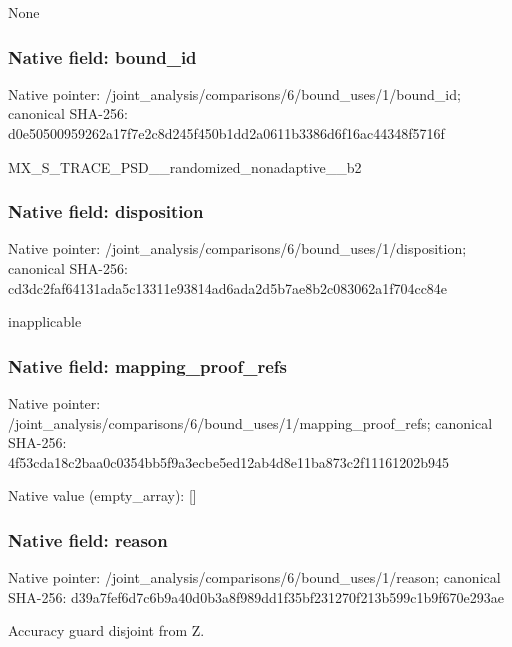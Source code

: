 \documentclass[10pt,a4paper]{article}
\begin{document}
\begingroup\raggedright\sloppy None\par\endgroup

\subsubsection{Native field: bound\_\allowbreak{}id}
Native pointer: /joint\_\allowbreak{}analysis/comparisons/6/bound\_\allowbreak{}uses/1/bound\_\allowbreak{}id; canonical SHA-256: d0e50500959262a17f7e2c8d245f450b1dd2a0611b3386d6f16ac44348f5716f

\begingroup\raggedright\sloppy MX\_\allowbreak{}S\_\allowbreak{}TRACE\_\allowbreak{}PSD\_\allowbreak{}\_\allowbreak{}randomized\_\allowbreak{}nonadaptive\_\allowbreak{}\_\allowbreak{}b2\par\endgroup

\subsubsection{Native field: disposition}
Native pointer: /joint\_\allowbreak{}analysis/comparisons/6/bound\_\allowbreak{}uses/1/disposition; canonical SHA-256: cd3dc2faf64131ada5c13311e93814ad6ada2d5b7ae8b2c083062a1f704cc84e

\begingroup\raggedright\sloppy inapplicable\par\endgroup

\subsubsection{Native field: mapping\_\allowbreak{}proof\_\allowbreak{}refs}
Native pointer: /joint\_\allowbreak{}analysis/comparisons/6/bound\_\allowbreak{}uses/1/mapping\_\allowbreak{}proof\_\allowbreak{}refs; canonical SHA-256: 4f53cda18c2baa0c0354bb5f9a3ecbe5ed12ab4d8e11ba873c2f11161202b945

Native value (empty\_\allowbreak{}array): []

\subsubsection{Native field: reason}
Native pointer: /joint\_\allowbreak{}analysis/comparisons/6/bound\_\allowbreak{}uses/1/reason; canonical SHA-256: d39a7fef6d7c6b9a40d0b3a8f989dd1f35bf231270f213b599c1b9f670e293ae

\begingroup\raggedright\sloppy Accuracy guard disjoint from Z.\par\endgroup
\end{document}
